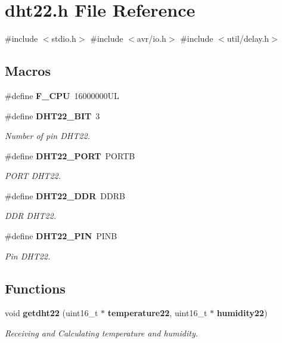 \section{dht22.\+h File Reference}
\label{dht22_8h}
{\ttfamily \#include $<$stdio.\+h$>$}\newline
{\ttfamily \#include $<$avr/io.\+h$>$}\newline
{\ttfamily \#include $<$util/delay.\+h$>$}\newline
\subsection*{Macros}
\begin{DoxyCompactItemize}
\item 
\#define \textbf{ F\+\_\+\+C\+PU}~16000000\+UL
\item 
\#define \textbf{ D\+H\+T22\+\_\+\+B\+IT}~3
\begin{DoxyCompactList}\small\item\em Number of pin D\+H\+T22. \end{DoxyCompactList}\item 
\#define \textbf{ D\+H\+T22\+\_\+\+P\+O\+RT}~P\+O\+R\+TB
\begin{DoxyCompactList}\small\item\em P\+O\+RT D\+H\+T22. \end{DoxyCompactList}\item 
\#define \textbf{ D\+H\+T22\+\_\+\+D\+DR}~D\+D\+RB
\begin{DoxyCompactList}\small\item\em D\+DR D\+H\+T22. \end{DoxyCompactList}\item 
\#define \textbf{ D\+H\+T22\+\_\+\+P\+IN}~P\+I\+NB
\begin{DoxyCompactList}\small\item\em Pin D\+H\+T22. \end{DoxyCompactList}\end{DoxyCompactItemize}
\subsection*{Functions}
\begin{DoxyCompactItemize}
\item 
void \textbf{ getdht22} (uint16\+\_\+t $\ast$\textbf{ temperature22}, uint16\+\_\+t $\ast$\textbf{ humidity22})
\begin{DoxyCompactList}\small\item\em Receiving and Calculating temperature and humidity. \end{DoxyCompactList}\end{DoxyCompactItemize}


